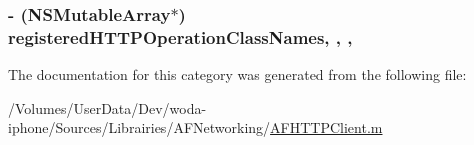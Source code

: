 \hypertarget{category_a_f_h_t_t_p_client_07_08_afa70d79a30e43329c545f47f508e6bf6}{
\subsubsection[{registered\-H\-T\-T\-P\-Operation\-Class\-Names}]{\setlength{\rightskip}{0pt plus 5cm}-\/ (N\-S\-Mutable\-Array$\ast$) registered\-H\-T\-T\-P\-Operation\-Class\-Names\hspace{0.3cm}{\ttfamily [read]}, {\ttfamily [write]}, {\ttfamily [nonatomic]}, {\ttfamily [strong]}}}\label{category_a_f_h_t_t_p_client_07_08_afa70d79a30e43329c545f47f508e6bf6}


The documentation for this category was generated from the following file\-:\begin{DoxyCompactItemize}
\item 
/\-Volumes/\-User\-Data/\-Dev/woda-\/iphone/\-Sources/\-Librairies/\-A\-F\-Networking/\hyperlink{_a_f_h_t_t_p_client_8m}{A\-F\-H\-T\-T\-P\-Client.\-m}\end{DoxyCompactItemize}
